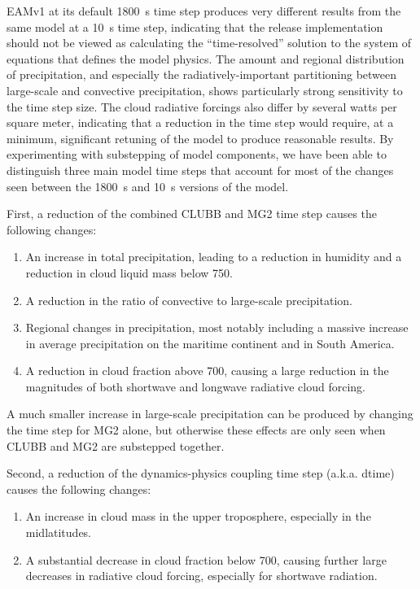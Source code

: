 \documentclass [11pt, proquest] {uwthesis}[2020/02/24]
\begin{document}
EAMv1 at its default \SI{1800}{\second} time step produces very different results from the same model at a \SI{10}{\second} time step, indicating that the release implementation should not be viewed as calculating the ``time-resolved'' solution to the system of equations that defines the model physics. The amount and regional distribution of precipitation, and especially the radiatively-important partitioning between large-scale and convective precipitation, shows particularly strong sensitivity to the time step size. The cloud radiative forcings also differ by several watts per square meter, indicating that a reduction in the time step would require, at a minimum, significant retuning of the model to produce reasonable results. By experimenting with substepping of model components, we have been able to distinguish three main model time steps that account for most of the changes seen between the \SI{1800}{\second} and \SI{10}{\second} versions of the model.

First, a reduction of the combined CLUBB and MG2 time step causes the following changes:

\begin{enumerate}
    \item An increase in total precipitation, leading to a reduction in humidity and a reduction in cloud liquid mass below \SI{750}{\millibar}.
    \item A reduction in the ratio of convective to large-scale precipitation.
    \item Regional changes in precipitation, most notably including a massive increase in average precipitation on the maritime continent and in South America.
    \item A reduction in cloud fraction above \SI{700}{\millibar}, causing a large reduction in the magnitudes of both shortwave and longwave radiative cloud forcing.
\end{enumerate}

A much smaller increase in large-scale precipitation can be produced by changing the time step for MG2 alone, but otherwise these effects are only seen when CLUBB and MG2 are substepped together.

Second, a reduction of the dynamics-physics coupling time step (a.k.a. dtime) causes the following changes:

\begin{enumerate}
    \item An increase in cloud mass in the upper troposphere, especially in the midlatitudes.
    \item A substantial decrease in cloud fraction below \SI{700}{\millibar}, causing further large decreases in radiative cloud forcing, especially for shortwave radiation.
\end{enumerate}
\end{document}
